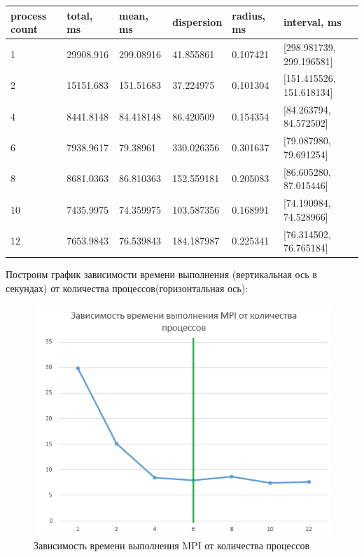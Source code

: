 \documentclass[14pt,a4paper,report]{report}
\begin{document}
\begin{table}[h!]
	\centering
	\bgroup
	\def\arraystretch{1}
	\begin{tabular}{ | m{2.1cm} | m{1.8cm} | m{1.8cm} | m{2.1cm} | m{2.1cm} | m{4.1cm} | }
		\hline
		process count & total, ms & mean, ms & dispersion & radius, ms & interval, ms \\ \hline
		1 			  & 29908.916 & 299.08916 & 41.855861 & 0.107421 & [298.981739, 299.196581] \\ \hline
		2 			  & 15151.683 & 151.51683 & 37.224975 & 0.101304 & [151.415526, 151.618134] \\ \hline
		4 			  & 8441.8148 & 84.418148 & 86.420509 & 0.154354 & [84.263794, 84.572502] \\ \hline
		6 			  & 7938.9617 & 79.38961 & 330.026356 & 0.301637 & [79.087980, 79.691254] \\ \hline
		8 			  & 8681.0363 & 86.810363 & 152.559181 & 0.205083 & [86.605280, 87.015446] \\ \hline
		10 			  & 7435.9975 & 74.359975 & 103.587356 & 0.168991 & [74.190984, 74.528966] \\ \hline
		12 			  & 7653.9843 & 76.539843 & 184.187987 & 0.225341 & [76.314502, 76.765184] \\
		\hline
	\end{tabular}
	\egroup
\end{table}

Построим график зависимости времени выполнения (вертикальная ось в секундах) от количества процессов(горизонтальная ось):

\begin{figure}[h!]
	\centering
	\includegraphics[scale = 0.7]{images/3.png}
	\caption{Зависимость времени выполнения MPI от количества процессов}
	\label{image:3}
\end{figure}
\end{document}

